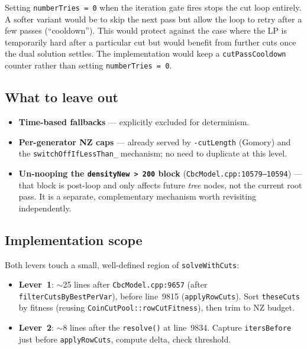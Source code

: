 \documentclass[11pt,a4paper]{article}
\begin{document}
Setting \texttt{numberTries = 0} when the iteration gate fires stops
the cut loop entirely.  A softer variant would be to skip the next
pass but allow the loop to retry after a few passes (``cooldown'').
This would protect against the case where the LP is temporarily hard
after a particular cut but would benefit from further cuts once the
dual solution settles.  The implementation would keep a
\texttt{cutPassCooldown} counter rather than setting
\texttt{numberTries = 0}.

\subsection*{What to leave out}

\begin{itemize}[leftmargin=*]
  \item \textbf{Time-based fallbacks} --- explicitly excluded for
        determinism.
  \item \textbf{Per-generator NZ caps} --- already served by
        \texttt{-cutLength} (Gomory) and the \texttt{switchOffIfLessThan\_}
        mechanism; no need to duplicate at this level.
  \item \textbf{Un-nooping the \texttt{densityNew > 200} block}
        (\texttt{CbcModel.cpp:10579--10594}) --- that block is
        post-loop and only affects future \emph{tree} nodes, not
        the current root pass.  It is a separate, complementary
        mechanism worth revisiting independently.
\end{itemize}

\subsection*{Implementation scope}

Both levers touch a small, well-defined region of \texttt{solveWithCuts}:

\begin{itemize}[leftmargin=*]
  \item \textbf{Lever~1}: $\sim$25 lines after
        \texttt{CbcModel.cpp:9657} (after \texttt{filterCutsByBestPerVar}),
        before line~9815 (\texttt{applyRowCuts}).  Sort \texttt{theseCuts}
        by fitness (reusing \texttt{CoinCutPool::rowCutFitness}), then
        trim to NZ budget.
  \item \textbf{Lever~2}: $\sim$8 lines after the \texttt{resolve()}
        at line~9834.  Capture \texttt{itersBefore} just before
        \texttt{applyRowCuts}, compute delta, check threshold.
\end{itemize}
\end{document}
